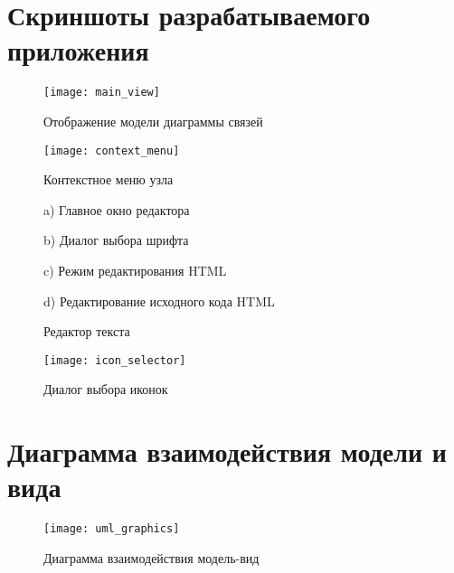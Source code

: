 \newpage
\appendix
{}
\chapter{Скриншоты разрабатываемого приложения}\label{ap:screenshot}

\begin{figure}[h!] 
\centering 
\texttt{[image: main\_view]} 
\caption{Отображение модели диаграммы связей}
\label{ris:main_view}
\end{figure}

\begin{figure}[h!] 
\centering 
\texttt{[image: context\_menu]} 
\caption{Контекстное меню узла}
\label{ris:context_menu}
\end{figure}

\begin{figure}[h!]
\begin{minipage}[h]{0.45\linewidth}
 a) Главное окно редактора\\
\end{minipage}
\hfill
\begin{minipage}[h]{0.45\linewidth}
 b) Диалог выбора шрифта\\
\label{ris:font_dialog}
\end{minipage}
\vfill
\begin{minipage}[h]{0.45\linewidth}
 c) Режим редактирования HTML\\
\end{minipage}
\hfill
\begin{minipage}[h]{0.45\linewidth}
 d) Редактирование исходного кода HTML\\
\end{minipage}
\caption{Редактор текста}
\label{ris:text_editor}
\end{figure}

\begin{figure}[h!] 
\centering 
\texttt{[image: icon\_selector]} 
\caption{Диалог выбора иконок}
\label{ris:icons_selector}
\end{figure}
\chapter{Диаграмма взаимодействия модели и вида}\label{ap:uml_scene}

\begin{figure}[h!] 
\centering 
\texttt{[image: uml\_graphics]} 
\caption{Диаграмма взаимодействия модель-вид}
\label{ris:uml_scene}
\end{figure}